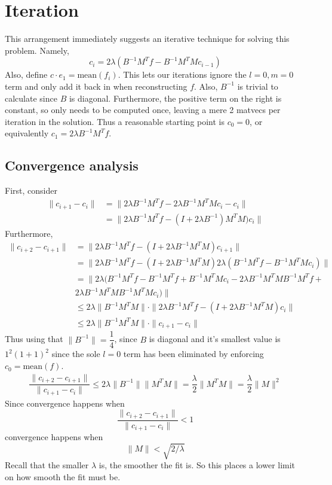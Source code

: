 \documentclass[12pt,a4paper]{article}
\newcommand{\mean}{\mathrm{mean}}
\begin{document}
\section{Iteration}
This arrangement immediately suggests an iterative technique for solving this problem.
Namely,
\begin{equation}\label{iter_alg}
    c_i = 2\lambda \left( B^{-1} M^T f - B^{-1} M^T M c_{i-1} \right)
\end{equation}
Also, define $c \cdot e_1 = \mean(f_i)$.
This lets our iterations ignore the $l=0, m=0$ term and only add it back in
when reconstructing $f$.
Also, $B^{-1}$ is trivial to calculate since $B$ is diagonal.
Furthermore, the positive term on the right is constant, so only needs to
be computed once, leaving a mere 2 matvecs per iteration in the solution.
Thus a reasonable starting point is $c_0 = 0$, 
or equivalently $c_1 = 2 \lambda B^{-1} M^T f$.

\subsection{Convergence analysis}
First, consider
\begin{align}\label{iter_eqn}
    \| c_{i+1} - c_i\| &= \| 2 \lambda B^{-1} M^T f - 2 \lambda B^{-1} M^T M c_i - c_i\|\\
    &= \| 2 \lambda B^{-1}M^T f - (I + 2 \lambda B^{-1}) M^T M) c_i \|
\end{align}
Furthermore,
\begin{align}
\|c_{i+2} - c_{i+1}\| &= \| 2 \lambda B^{-1} M^T f - (I + 2 \lambda B^{-1} M^T M) c_{i+1} \| \\
&= \| 2 \lambda B^{-1} M^T f - (I + 2 \lambda B^{-1} M^T M) 2 \lambda (B^{-1} M^T f - B^{-1} M^T M c_i)\| \\
&=\| 2 \lambda (B^{-1}M^T f - B^{-1}M^Tf + B^{-1}M^TMc_i - 2\lambda B^{-1}M^TMB^{-1}M^Tf + \\
&  2\lambda B^{-1}M^TMB^{-1}M^TMc_i) \| \\
&\leq 2 \lambda \|B^{-1}M^TM\| \cdot \|2\lambda B^{-1}M^Tf - (I + 2\lambda B^{-1} M^TM)c_i\| \\
&\leq 2 \lambda \|B^{-1}M^TM\| \cdot \|c_{i+1} - c_i \|
\end{align}
Thus using that $\|B^{-1}\| = \dfrac{1}{4}$, since $B$ is diagonal and it's smallest value
is $1^2(1+1)^2$ since the sole $l=0$ term has been eliminated by enforcing $c_0 = \mean(f)$.
\begin{align}
\dfrac{\|c_{i+2} - c_{i+1}\|}{\|c_{i+1} - c_i\|} \leq 2 \lambda \|B^{-1}\| \|M^T M\|
= \dfrac{\lambda}{2}\|M^T M\| = \dfrac{\lambda}{2} \|M\|^2
\end{align}
Since convergence happens when
\[
\dfrac{\|c_{i+2} - c_{i+1}\|}{\|c_{i+1} - c_i\|} < 1
\]
convergence happens when
\begin{equation}\label{l_ineq}
\|M\| < \sqrt{2/\lambda}
\end{equation}
Recall that the smaller $\lambda$ is, the smoother the fit is.
So this places a lower limit on how smooth the fit must be.
\end{document}
